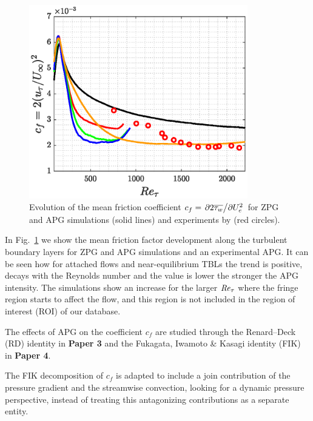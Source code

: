 \begin{figure}
    \centering
    \includegraphics[width=0.85\textwidth]{imgs/stats/cf_Retau.eps}
    \caption{Evolution of the mean friction coefficient $c_f = \pdv{2\overline{\tau_w}}/{U_e^2}$ for ZPG and APG simulations (solid lines) and experiments by \cite{MTL_expSANMIGUEL} (red circles).}
    \label{fig:cap3_evol_cf}
\end{figure}

In Fig.~\ref{fig:cap3_evol_cf} we show the mean friction factor development along the turbulent boundary layers for ZPG and APG simulations and an experimental APG.
It can be seen how for attached flows and near-equilibrium TBLs the trend is positive, decays with the Reynolds number and the value is lower the stronger the APG intensity.
The simulations show an increase for the larger $\mbox{\textit{Re}}_{\tau}$ where the fringe region starts to affect the flow, and this region is not included in the region of interest (ROI) of our database.

The effects of APG on the coefficient $c_f$ are studied through the Renard--Deck (RD) \citep{Renard2016} identity in \textbf{Paper 3} and the Fukagata, Iwamoto \& Kasagi identity (FIK)  \citep{Fukagata2002} in \textbf{Paper 4}.

The FIK decomposition of $c_f$ is adapted to include a join contribution of the pressure gradient and the streamwise convection, looking for a dynamic pressure perspective, instead of treating this antagonizing contributions as a separate entity.

